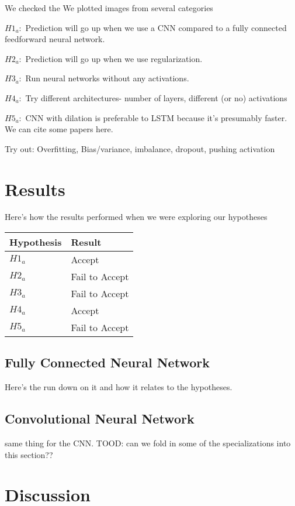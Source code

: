 \documentclass[]{article}
\begin{document}
We checked the We plotted images from several categories

\(H1_a:\) Prediction will go up when we use a CNN compared to a fully
connected feedforward neural network.

\(H2_a:\) Prediction will go up when we use regularization.

\(H3_a:\) Run neural networks without any activations.

\(H4_a:\) Try different architectures- number of layers, different (or
no) activations

\(H5_a:\) CNN with dilation is preferable to LSTM because it's
presumably faster. We can cite some papers here.

Try out: Overfitting, Bias/variance, imbalance, dropout, pushing
activation

\hypertarget{results}{%
\section{Results}\label{results}}

Here's how the results performed when we were exploring our hypotheses

\begin{longtable}[]{@{}ll@{}}
\toprule
Hypothesis & Result\tabularnewline
\midrule
\endhead
\(H1_a\) & Accept\tabularnewline
\(H2_a\) & Fail to Accept\tabularnewline
\(H3_a\) & Fail to Accept\tabularnewline
\(H4_a\) & Accept\tabularnewline
\(H5_a\) & Fail to Accept\tabularnewline
\bottomrule
\end{longtable}

\hypertarget{fully-connected-neural-network}{%
\subsection{Fully Connected Neural
Network}\label{fully-connected-neural-network}}

Here's the run down on it and how it relates to the hypotheses.

\hypertarget{convolutional-neural-network}{%
\subsection{Convolutional Neural
Network}\label{convolutional-neural-network}}

same thing for the CNN. TOOD: can we fold in some of the specializations
into this section??

\hypertarget{discussion}{%
\section{Discussion}\label{discussion}}
\end{document}
